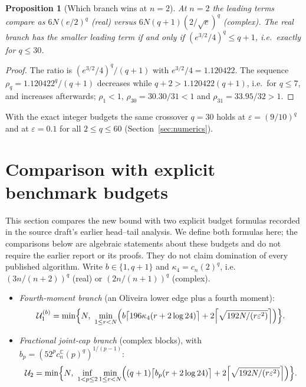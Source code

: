 \documentclass[11pt,a4paper]{article}
\newtheorem{proposition}[theorem]{Proposition}
\theoremstyle{definition}\newtheorem{definition}[theorem]{Definition}
\theoremstyle{remark}\newtheorem{remark}[theorem]{Remark}
\numberwithin{equation}{section}
\newcommand{\C}{\mathbb C}
\newcommand{\eps}{\varepsilon}
\begin{document}
\begin{proposition}[Which branch wins at $n=2$]\label{prop:crossover}
At $n=2$ the leading terms compare as
$6N(e/2)^q$ (real) versus $6N(q+1)(2/\sqrt e)^q$ (complex). The real branch has
the smaller leading term if and only if $(e^{3/2}/4)^q\le q+1$, i.e.\ exactly
for $q\le30$.
\end{proposition}
\begin{proof}
The ratio is $(e^{3/2}/4)^q/(q+1)$ with $e^{3/2}/4=1.120422$. The sequence
$\rho_q=1.120422^q/(q+1)$ decreases while $q+2>1.120422(q+1)$, i.e.\ for $q\le7$,
and increases afterwards; $\rho_1<1$, $\rho_{30}=30.30/31<1$ and
$\rho_{31}=33.95/32>1$.
\end{proof}
With the exact integer budgets the same crossover $q=30$ holds at
$\eps=(9/10)^q$ and at $\eps=0.1$ for all $2\le q\le60$ (Section~\ref{sec:numerics}).

\section{Comparison with explicit benchmark budgets}\label{sec:comparison}
This section compares the new bound with two explicit budget formulas
recorded in the source draft's earlier head--tail analysis. We define both
formulas here; the comparisons below are algebraic statements about these
budgets and do not require the earlier report or its proofs. They do not
claim domination of every published algorithm. Write $b\in\{1,q+1\}$ and
$\kappa_4=c_n(2)^q$, i.e.\ $(3n/(n+2))^q$ (real) or $(2n/(n+1))^q$ (complex).
\begin{itemize}
\item \emph{Fourth-moment branch} (an Oliveira lower edge plus a fourth moment):
\[
 \mathcal U_1^{(b)}=\min\Bigl\{N,\ \min_{1\le r<N}\Bigl(b\bigl\lceil196\kappa_4(r+2\log24)\bigr\rceil
 +2\Bigl\lceil\sqrt{192N/(r\eps^2)}\Bigr\rceil\Bigr)\Bigr\}.
\]
\item \emph{Fractional joint-cap branch} (complex blocks), with
$b_p=(52^pc^{\C}_n(p)^q)^{1/(p-1)}$:
\[
 \mathcal U_2=\min\Bigl\{N,\ \inf_{1<p\le2}\min_{1\le r<N}\Bigl((q+1)\bigl\lceil b_p(r+2\log24)\bigr\rceil
 +2\Bigl\lceil\sqrt{192N/(r\eps^2)}\Bigr\rceil\Bigr)\Bigr\}.
\]
\end{itemize}
\end{document}
